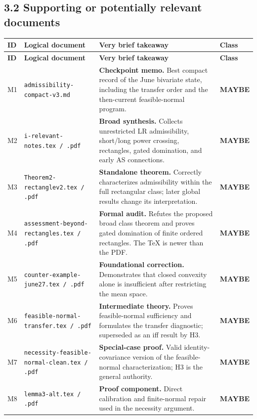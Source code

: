 \documentclass[10pt]{article}
\newcommand{\maybe}{\colorbox{maybebg}{\textcolor{maybefg}{\sffamily\bfseries MAYBE}}}
\newcommand{\fname}[1]{{\footnotesize\nolinkurl{#1}}}
\begin{document}
\subsection*{3.2 Supporting or potentially relevant documents}

\begin{longtable}{@{}L{0.050\textwidth}L{0.270\textwidth}L{0.455\textwidth}L{0.125\textwidth}@{}}
\toprule
\textbf{ID} & \textbf{Logical document} & \textbf{Very brief takeaway} & \textbf{Class}\\
\midrule
\endfirsthead
\toprule
\textbf{ID} & \textbf{Logical document} & \textbf{Very brief takeaway} & \textbf{Class}\\
\midrule
\endhead
M1 & \fname{admissibility-compact-v3.md} & \textbf{Checkpoint memo.} Best compact record of the June bivariate state, including the transfer order and the then-current feasible-normal program. & \maybe\\[4pt]
M2 & \fname{i-relevant-notes.tex / .pdf} & \textbf{Broad synthesis.} Collects unrestricted LR admissibility, short/long power crossing, rectangles, gated domination, and early AS connections. & \maybe\\[4pt]
M3 & \fname{Theorem2-rectanglev2.tex / .pdf} & \textbf{Standalone theorem.} Correctly characterizes admissibility within the full rectangular class; later global results change its interpretation. & \maybe\\[4pt]
M4 & \fname{assessment-beyond-rectangles.tex / .pdf} & \textbf{Formal audit.} Refutes the proposed broad class theorem and proves gated domination of finite ordered rectangles.  The TeX is newer than the PDF. & \maybe\\[4pt]
M5 & \fname{counter-example-june27.tex / .pdf} & \textbf{Foundational correction.} Demonstrates that closed convexity alone is insufficient after restricting the mean space. & \maybe\\[4pt]
M6 & \fname{feasible-normal-transfer.tex / .pdf} & \textbf{Intermediate theory.} Proves feasible-normal sufficiency and formulates the transfer diagnostic; superseded as an iff result by H3. & \maybe\\[4pt]
M7 & \fname{necessity-feasible-normal-clean.tex / .pdf} & \textbf{Special-case proof.} Valid identity-covariance version of the feasible-normal characterization; H3 is the general authority. & \maybe\\[4pt]
M8 & \fname{lemma3-alt.tex / .pdf} & \textbf{Proof component.} Direct calibration and finite-normal repair used in the necessity argument. & \maybe\\[4pt]

\end{longtable}
\end{document}
